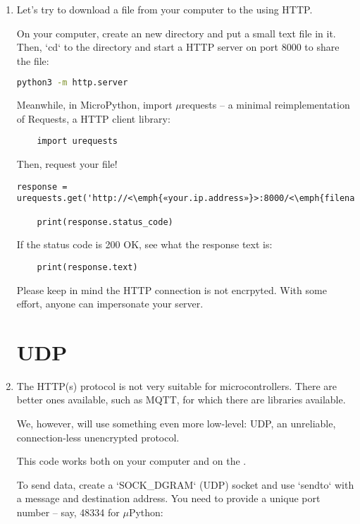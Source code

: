 \documentclass{../tutorial}
\begin{document}
\begin{enumerate}
\item
    Let's try to download a file from your computer to the 
    using HTTP.

    On your computer, create an new directory and put a small text file in it.
    Then, `cd` to the directory and start a HTTP server on port 8000
    to share the file:

    \begin{lstlisting}[language=bash]
    python3 -m http.server
    \end{lstlisting}

    Meanwhile, in MicroPython, import $\mu$requests – a minimal
    reimplementation of Requests, a HTTP client library:

    \begin{lstlisting}
    import urequests
    \end{lstlisting}

    Then, request your file!

    \begin{lstlisting}[escapeinside=<>]
    response = urequests.get('http://<\emph{«your.ip.address»}>:8000/<\emph{filename.txt}>')

    print(response.status_code)
    \end{lstlisting}

    If the status code is 200 OK, see what the response text is:

    \begin{lstlisting}
    print(response.text)
    \end{lstlisting}

    Please keep in mind the HTTP connection is not encrpyted.
    With some effort, anyone can impersonate your server.

\section{UDP}

\item
    The HTTP(s) protocol is not very suitable for microcontrollers.
    There are better ones available, such as MQTT, for which there are
    libraries available.

    We, however, will use something even more low-level: UDP,
    an unreliable, connection-less unencrypted protocol.

    This code works both on your computer and on the .

    To send data, create a `SOCK_DGRAM` (UDP) socket and use `sendto`
    with a message and destination address.
    You need to provide a unique port number – say, 48334 for $\mu$Python:


\end{enumerate}
\end{document}
